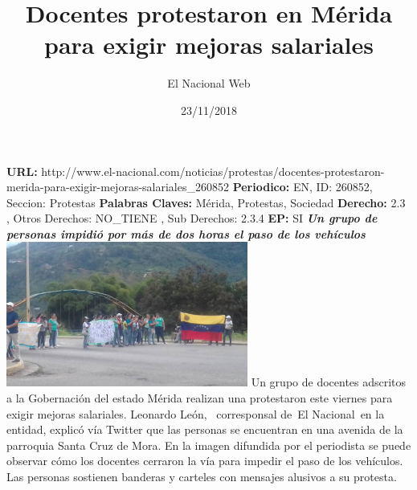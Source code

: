 \documentclass{article}%
\title{\textbf{Docentes protestaron en Mérida para exigir mejoras salariales}}%
\author{El Nacional Web}%
\date{23/11/2018}%
\begin{document}
%
\normalsize%
\maketitle%
\textbf{URL: }%
http://www.el{-}nacional.com/noticias/protestas/docentes{-}protestaron{-}merida{-}para{-}exigir{-}mejoras{-}salariales\_260852\newline%
%
\textbf{Periodico: }%
EN, %
ID: %
260852, %
Seccion: %
Protestas\newline%
%
\textbf{Palabras Claves: }%
Mérida, Protestas, Sociedad\newline%
%
\textbf{Derecho: }%
2.3%
, Otros Derechos: %
NO\_TIENE%
, Sub Derechos: %
2.3.4%
\newline%
%
\textbf{EP: }%
SI\newline%
\newline%
%
\textbf{\textit{Un grupo de personas impidió por más de dos horas el paso de los vehículos}}%
\newline%
\newline%
%
\includegraphics[width=300px]{144.jpg}%
\newline%
%
Un grupo de docentes adscritos a la Gobernación del estado Mérida realizan una protestaron este viernes para exigir mejoras salariales.%
\newline%
%
Leonardo León, ~corresponsal de~El Nacional~en la entidad, explicó vía Twitter que las personas se encuentran en una avenida de la parroquia Santa Cruz de Mora.%
\newline%
%
En la imagen difundida por el periodista se puede observar cómo los docentes cerraron la vía para impedir el paso de los vehículos. Las personas sostienen banderas y carteles con mensajes alusivos a su protesta.%
\newline%
%
\end{document}
